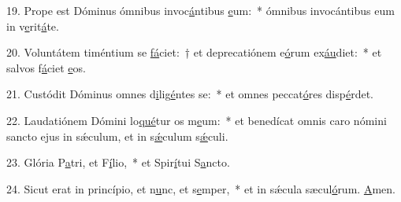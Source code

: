 19. Prope est Dóminus ómnibus invoc\uline{á}ntibus \uline{e}um:~* ómnibus invocántibus eum in v\uline{e}rit\uline{á}te.\par 
20. Voluntátem timéntium se \uline{fá}ciet:~† et deprecatiónem e\uline{ó}rum ex\uline{áu}diet:~* et salvos f\uline{á}ciet \uline{e}os.\par 
21. Custódit Dóminus omnes d\uline{i}lig\uline{é}ntes se:~* et omnes peccat\uline{ó}res disp\uline{é}rdet.\par 
22. Laudatiónem Dómini lo\uline{qué}tur os m\uline{e}um:~* et benedícat omnis caro nómini sancto ejus in sǽculum, et in s\uline{ǽ}culum s\uline{ǽ}culi.\par 
23. Glória P\uline{a}tri, et F\uline{í}lio,~* et Spir\uline{í}tui S\uline{a}ncto.\par 
24. Sicut erat in princípio, et n\uline{u}nc, et s\uline{e}mper,~* et in sǽcula sæcul\uline{ó}rum. \uline{A}men.\par 
